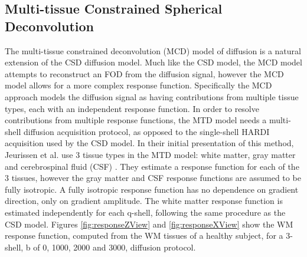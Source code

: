 \subsection{Multi-tissue Constrained Spherical Deconvolution}

The multi-tissue constrained deconvolution (MCD) model of diffusion is a natural extension of the CSD diffusion model. Much like the CSD model, the MCD model attempts to reconstruct an FOD from the diffusion signal, however the MCD model allows for a more complex response function. Specifically the MCD approach models the diffusion signal as having contributions from multiple tissue types, each with an independent response function. In order to resolve contributions from multiple response functions, the MTD model needs a multi-shell diffusion acquisition protocol, as opposed to the single-shell HARDI acquisition used by the CSD model. In their initial presentation of this method, Jeurissen et al. use 3 tissue types in the MTD model: white matter, gray matter and cerebrospinal fluid (CSF) \cite{Jeurissen_2014}. They estimate a response function for each of the 3 tissues, however the gray matter and CSF response functions are assumed to be fully isotropic. A fully isotropic response function has no dependence on gradient direction, only on gradient amplitude. The white matter response function is estimated independently for each q-shell, following the same procedure as the CSD model. Figures \ref{fig:responseZView} and \ref{fig:responseXView} show the WM response function, computed from the WM tissues of a healthy subject, for a 3-shell, b of 0, 1000, 2000 and 3000, diffusion protocol.